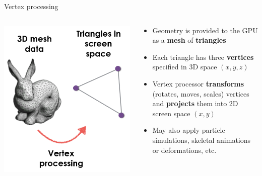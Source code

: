 \begin{frame}{Vertex processing}
\begin{columns}
\begin{column}{0.3\textwidth}
	\includegraphics[width=\textwidth]{pipeline_1}
\end{column}
\begin{column}{0.65\textwidth}
	\begin{itemize}
		\pause\item Geometry is provided to the GPU as a \textbf{mesh} of \textbf{triangles}
		\pause\item Each triangle has three \textbf{vertices} specified in 3D space $(x,y,z)$
		\pause\item Vertex processor \textbf{transforms} (rotates, moves, scales) vertices
		and \textbf{projects} them into 2D screen space $(x,y)$
		\pause\item May also apply particle simulations, skeletal animations or deformations, etc.
	\end{itemize}
\end{column}
\end{columns}
\end{frame}

